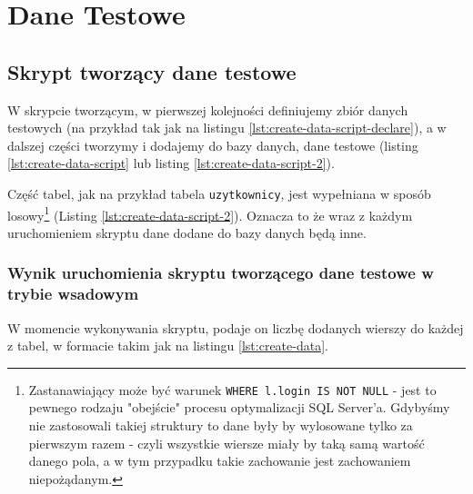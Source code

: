 \section{Dane Testowe}

\subsection{Skrypt tworzący dane testowe}

W skrypcie tworzącym, w pierwszej kolejności definiujemy zbiór danych testowych (na przykład tak jak na listingu \ref{lst:create-data-script-declare}), a w dalszej części tworzymy i dodajemy do bazy danych, dane testowe (listing \ref{lst:create-data-script} lub listing \ref{lst:create-data-script-2}).

Część tabel, jak na przykład tabela \texttt{uzytkownicy}, jest wypełniana w sposób losowy\footnote{Zastanawiający może być warunek \texttt{WHERE l.login IS NOT NULL} - jest to pewnego rodzaju "obejście" procesu optymalizacji SQL Server'a. Gdybyśmy nie zastosowali takiej struktury to dane były by wylosowane tylko za pierwszym razem - czyli wszystkie wiersze miały by taką samą wartość danego pola, a w tym przypadku takie zachowanie jest zachowaniem niepożądanym.} (Listing \ref{lst:create-data-script-2}). Oznacza to że wraz z każdym uruchomieniem skryptu dane dodane do bazy danych będą inne.







\subsubsection{Wynik uruchomienia skryptu tworzącego dane testowe w trybie wsadowym}

W momencie wykonywania skryptu, podaje on liczbę dodanych wierszy do każdej z tabel, w formacie takim jak na listingu \ref{lst:create-data}.



